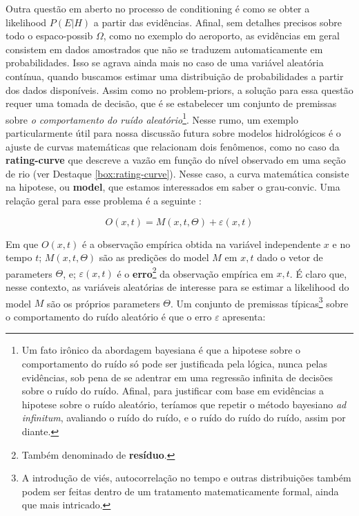 \documentclass[./main.tex]{subfiles}
\begin{document}
\par Outra questão em aberto no processo de \gls{conditioning} é como se obter a \gls{likelihood} $P(E | H)$ a partir das evidências. Afinal, sem detalhes precisos sobre todo o \gls{espaco-possib} $\Omega$, como no exemplo do aeroporto, as evidências em geral consistem em dados amostrados que não se traduzem automaticamente em probabilidades. Isso se agrava ainda mais no caso de uma variável aleatória contínua, quando buscamos estimar uma distribuição de probabilidades a partir dos dados disponíveis. Assim como no \gls{problem-priors}, a solução para essa questão requer uma tomada de decisão, que é se estabelecer um conjunto de premissas sobre \textit{o comportamento do ruído aleatório}\footnote{Um fato irônico da abordagem bayesiana é que a \gls{hipotese} sobre o comportamento do ruído só pode ser justificada pela lógica, nunca pelas evidências, sob pena de se adentrar em uma regressão infinita de decisões sobre o ruído do ruído. Afinal, para justificar com base em evidências a \gls{hipotese} sobre o ruído aleatório, teríamos que repetir o método bayesiano \textit{ad infinitum}, avaliando o ruído do ruído, e o ruído do ruído do ruído, assim por diante.}. Nesse rumo, um exemplo particularmente útil para nossa discussão futura sobre modelos hidrológicos é o ajuste de curvas matemáticas que relacionam dois fenômenos, como no caso da \textbf{\gls{rating-curve}} que descreve a vazão em função do nível observado em uma seção de rio (ver Destaque \ref{box:rating-curve}).  Nesse caso, a curva matemática consiste na \gls{hipotese}, ou \textbf{\gls{model}}, que estamos interessados em saber o \gls{grau-convic}.  Uma relação geral para esse problema é a seguinte \cite{Box1979}:
\begin{linenomath*}
\begin{equation}
\label{eq:bayes-model}
    O(x, t) = M(x, t, \Theta) + \varepsilon(x, t)
\end{equation}
\end{linenomath*}
Em que $O(x, t)$ é a observação empírica obtida na variável independente $x$ e no tempo $t$; $M(x, t, \Theta)$ são as predições do \gls{model} $M$ em $x,t$ dado o vetor de \gls{parameters} $\Theta$, e; $\varepsilon(x, t)$ é o \textbf{erro}\footnote{Também denominado de \textbf{resíduo}.} da observação empírica em $x,t$. É claro que, nesse contexto, as variáveis aleatórias de interesse para se estimar a \gls{likelihood} do \gls{model} $M$ são os próprios \gls{parameters} $\Theta$. Um conjunto de premissas típicas\footnote{A introdução de viés, autocorrelação no tempo e outras distribuições também podem ser feitas dentro de um tratamento matematicamente formal, ainda que mais intricado.} sobre o comportamento do ruído aleatório é que o erro $\varepsilon$ apresenta:
\end{document}
